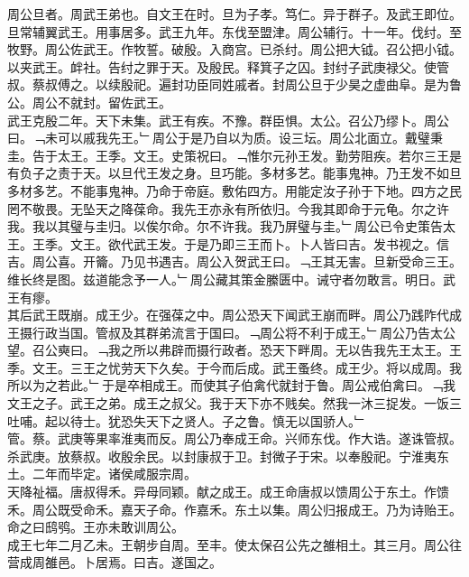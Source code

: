 \documentclass{zhvt-classic}
\begin{document}

\hspace*{2em}周公旦者。周武王弟也。自文王在时。旦为子孝。笃仁。异于群子。及武王即位。旦常辅翼武王。用事居多。武王九年。东伐至盟津。周公辅行。十一年。伐纣。至牧野。周公佐武王。作牧誓。破殷。入商宫。已杀纣。周公把大钺。召公把小钺。以夹武王。衅社。告纣之罪于天。及殷民。释箕子之囚。封纣子武庚禄父。使管叔。蔡叔傅之。以续殷祀。遍封功臣同姓戚者。封周公旦于少昊之虚曲阜。是为鲁公。周公不就封。留佐武王。\\
\hspace*{2em}武王克殷二年。天下未集。武王有疾。不豫。群臣惧。太公。召公乃缪卜。周公曰。﹁未可以戚我先王。﹂周公于是乃自以为质。设三坛。周公北面立。戴璧秉圭。告于太王。王季。文王。史策祝曰。﹁惟尔元孙王发。勤劳阻疾。若尔三王是有负子之责于天。以旦代王发之身。旦巧能。多材多艺。能事鬼神。乃王发不如旦多材多艺。不能事鬼神。乃命于帝庭。敷佑四方。用能定汝子孙于下地。四方之民罔不敬畏。无坠天之降葆命。我先王亦永有所依归。今我其即命于元龟。尔之许我。我以其璧与圭归。以俟尔命。尔不许我。我乃屏璧与圭。﹂周公已令史策告太王。王季。文王。欲代武王发。于是乃即三王而卜。卜人皆曰吉。发书视之。信吉。周公喜。开籥。乃见书遇吉。周公入贺武王曰。﹁王其无害。旦新受命三王。维长终是图。兹道能念予一人。﹂周公藏其策金縢匮中。诫守者勿敢言。明日。武王有瘳。\\
\hspace*{2em}其后武王既崩。成王少。在强葆之中。周公恐天下闻武王崩而畔。周公乃践阼代成王摄行政当国。管叔及其群弟流言于国曰。﹁周公将不利于成王。﹂周公乃告太公望。召公奭曰。﹁我之所以弗辟而摄行政者。恐天下畔周。无以告我先王太王。王季。文王。三王之忧劳天下久矣。于今而后成。武王蚤终。成王少。将以成周。我所以为之若此。﹂于是卒相成王。而使其子伯禽代就封于鲁。周公戒伯禽曰。﹁我文王之子。武王之弟。成王之叔父。我于天下亦不贱矣。然我一沐三捉发。一饭三吐哺。起以待士。犹恐失天下之贤人。子之鲁。慎无以国骄人。﹂\\
\hspace*{2em}管。蔡。武庚等果率淮夷而反。周公乃奉成王命。兴师东伐。作大诰。遂诛管叔。杀武庚。放蔡叔。收殷余民。以封康叔于卫。封微子于宋。以奉殷祀。宁淮夷东土。二年而毕定。诸侯咸服宗周。\\
\hspace*{2em}天降祉福。唐叔得禾。异母同颖。献之成王。成王命唐叔以馈周公于东土。作馈禾。周公既受命禾。嘉天子命。作嘉禾。东土以集。周公归报成王。乃为诗贻王。命之曰鸱鸮。王亦未敢训周公。\\
\hspace*{2em}成王七年二月乙未。王朝步自周。至丰。使太保召公先之雒相土。其三月。周公往营成周雒邑。卜居焉。曰吉。遂国之。\\
\end{document}

